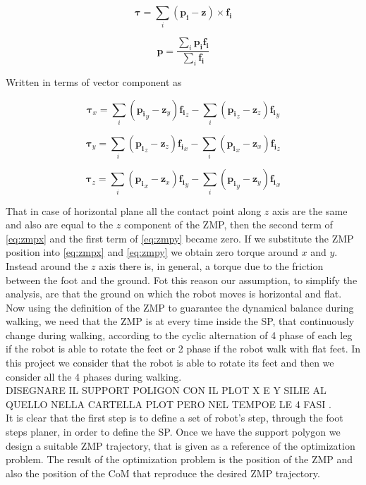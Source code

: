 \documentclass[a4paper]{article}
\begin{document}
\begin{equation}
\pmb{\tau} = \sum_i{(\pmb{p_i}-\pmb{z})}\times \pmb{f_i}
\label{eq:zmpcond}
\end{equation} 

\begin{equation}
\pmb{p} = \frac{\sum_i{\pmb{p_i}\pmb{f_i}}}{\sum_i\pmb{f_i}}
\label{eq:zmppoint}
\end{equation} 



Written in terms of vector component as

\begin{equation}
\pmb{\tau}_x = \sum_i{(\pmb{p_i}_y-\pmb{z}_y)}\pmb{f_i}_z-\sum_i{(\pmb{p_i}_z-\pmb{z}_z)}\pmb{f_i}_y
\label{eq:zmpx}
\end{equation} 

\begin{equation}
\pmb{\tau}_y = \sum_i{(\pmb{p_i}_z-\pmb{z}_z)}\pmb{f_i}_x-\sum_i{(\pmb{p_i}_x-\pmb{z}_x)}\pmb{f_i}_z
\label{eq:zmpy}
\end{equation} 

\begin{equation}
\pmb{\tau}_z = \sum_i{(\pmb{p_i}_x-\pmb{z}_x)}\pmb{f_i}_y-\sum_i{(\pmb{p_i}_y-\pmb{z}_y)}\pmb{f_i}_x
\label{eq:zmpz}
\end{equation} 

That in case of horizontal plane all the contact point along $z$ axis are the same and also are equal to the $z$ component of the ZMP, then the second term of \ref{eq:zmpx} and the first term of \ref{eq:zmpy} became zero. If we substitute the ZMP position into \ref{eq:zmpx} and \ref{eq:zmpy} we obtain zero torque around $x$ and $y$. Instead around the $z$ axis there is, in general, a torque due to the friction between the foot and the ground. Fot this reason our assumption, to simplify the analysis, are that the ground on which the robot moves is horizontal and flat.\\
Now using the definition of the ZMP to guarantee the dynamical balance during walking, we need that the ZMP is at every time inside the SP, that continuously change during walking, according to the cyclic alternation of 4 phase of each leg if the robot is able to rotate the feet or 2 phase if the robot walk with flat feet. In this project we consider that the robot is able to rotate its feet and then we consider all the 4 phases during walking.\\
DISEGNARE IL SUPPORT POLIGON CON IL PLOT X E Y SILIE AL QUELLO NELLA CARTELLA PLOT PERO NEL TEMPOE LE 4 FASI .\\
It is clear that the first step is to define a set of robot's step, through the foot steps planer, in order to define the SP. Once we have the support polygon we design a suitable ZMP trajectory, that is given as a reference of the optimization problem. The result of the optimization problem is the position of the ZMP and also the position of the CoM that reproduce the desired ZMP trajectory. 
\end{document}
